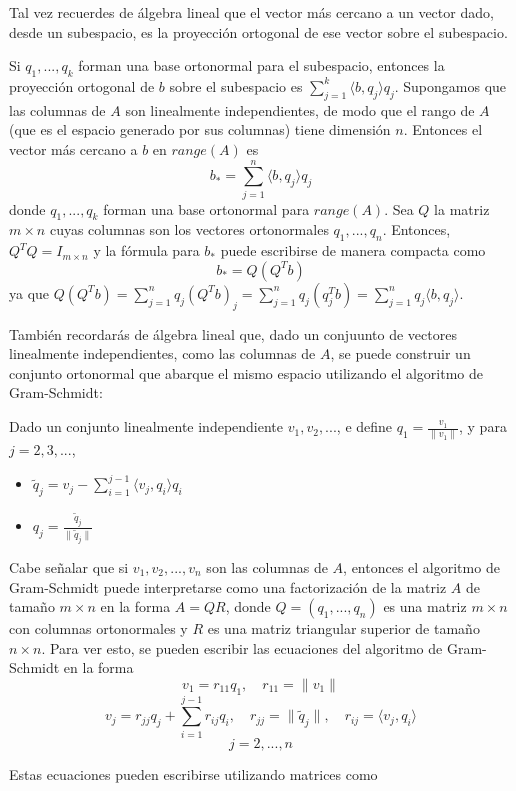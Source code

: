Tal vez recuerdes de álgebra lineal que el vector más cercano a un vector dado, desde un subespacio, es la proyección ortogonal de ese vector sobre el subespacio.

Si $q_1, ..., q_k$ forman una base ortonormal para el subespacio, entonces la proyección ortogonal de $b$ sobre el subespacio es $\sum_{j = 1}^{k} \langle b, q_j \rangle q_j$. Supongamos que las columnas de $A$ son linealmente independientes, de modo que el rango de $A$ (que es el espacio generado por sus columnas) tiene dimensión $n$. Entonces el vector más cercano a $b$ en $range(A)$ es
\[ b_* = \sum_{j = 1}^{n} \langle b, q_j \rangle q_j \]
donde $q_1, ..., q_k$ forman una base ortonormal para $range(A)$. Sea $Q$ la matriz $m \times n$ cuyas columnas son los vectores ortonormales $q_1, ..., q_n$. Entonces, $Q^TQ = I_{m \times n}$ y la fórmula para $b_*$ puede escribirse de manera compacta como
\[ b_* = Q (Q^Tb) \]
ya que $Q(Q^T b) = \sum_{j = 1}^{n} q_j (Q^T b)_j = \sum_{j = 1}^{n} q_j (q_j^T b) = \sum_{j = 1}^{n} q_j \langle b, q_j \rangle$.

También recordarás de álgebra lineal  que, dado un conjuunto de vectores linealmente independientes, como las columnas de $A$, se puede construir un conjunto ortonormal que abarque el mismo espacio utilizando el algoritmo de Gram-Schmidt:

Dado un conjunto linealmente independiente $v_1, v_2,...$, e define $q_1 = \frac{v_1}{\|v_1\|}$, y para $j = 2, 3,...$,
\begin{itemize}
    \item $\tilde{q}_j = v_j - \sum_{i = 1}^{j -1} \langle v_j, q_i \rangle q_i$
    \item $q_j = \frac{\tilde{q}_j}{\| \tilde{q}_j \|}$
\end{itemize}

Cabe señalar que si $v_1, v_2,..., v_n$ son las columnas de $A$, entonces el algoritmo de Gram-Schmidt puede interpretarse como una factorización de la matriz $A$ de tamaño $m \times n$ en la forma $A = QR$, donde $Q = (q_1, ..., q_n)$ es una matriz $m \times n$ con columnas ortonormales y $R$ es una matriz triangular superior de tamaño $n \times n$. Para ver esto, se pueden escribir las ecuaciones del algoritmo de Gram-Schmidt en la forma
\[ v_1 = r_{11} q_1, \quad r_{11} = \|v_1\| \]
\[ v_j = r_{jj} q_j + \sum_{i = 1}^{j - 1} r_{ij} q_i, \quad r_{jj} = \| \tilde{q}_j \|, \quad r_{ij} = \langle v_j, q_i \rangle \]
\[ j = 2,...,n \]

Estas ecuaciones pueden escribirse utilizando matrices como

